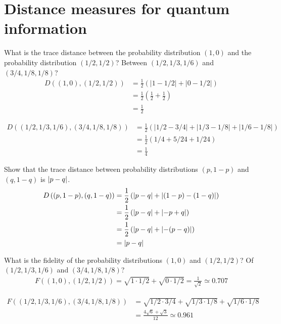 
\chapter{Distance measures for quantum information}
 What is the trace distance between the probability distribution $(1, 0)$ and the probability distribution $(1/2, 1/2)$?  Between $(1/2,1/3,1/6)$ and $(3/4, 1/8, 1/8)$?
\Soln
\begin{align*}
	D((1,0), (1/2,1/2)) &= \frac{1}{2} \left( |1 - 1/2| + |0 - 1/2| \right)\\
		&= \frac{1}{2} \left(\frac{1}{2} +  \frac{1}{2} \right)\\
		&= \frac{1}{2}
\end{align*}

\begin{align*}
	D\left( (1/2,1/3,1/6), (3/4, 1/8, 1/8)  \right) &= \frac{1}{2} \left( |1/2 - 3/4| + |1/3 - 1/8| + |1/6 - 1/8| \right)\\
		&= \frac{1}{2} \left( 1/4 + 5 / 24 + 1/24 \right)\\
		&= \frac{1}{4}
\end{align*}



 Show that the trace distance between probability distributions $(p, 1-p)$ and $(q, 1-q)$ is $\left\lvert p-q\right\rvert$.
\Soln
\begin{align*}
	D\left((p,1-p), (q, 1-q)\right) &= \frac{1}{2} \left( \left\lvert p-q\right\rvert + \left\lvert(1-p) - (1-q)\right\rvert \right)\\
		&= \frac{1}{2} \left( \left\lvert p-q\right\rvert + \left\lvert-p + q\right\rvert \right)\\
		&= \frac{1}{2} \left( \left\lvert p-q\right\rvert + \left\lvert-(p-q)\right\rvert\right) \\
		&= \left\lvert p-q\right\rvert
\end{align*}


 What is the fidelity of the probability distributions $(1, 0)$ and $(1/2, 1/2)$?  Of $(1/2,1/3,1/6)$ and $(3/4, 1/8, 1/8)$?
\Soln
\begin{align*}
	F((1,0), (1/2,1/2)) = \sqrt{1 \cdot 1/2} + \sqrt{0 \cdot 1/2} = \frac{1}{\sqrt{2}}\simeq 0.707
\end{align*}

\begin{align*}
	F\left( (1/2,1/3,1/6), (3/4, 1/8, 1/8)  \right) &= \sqrt{1/2 \cdot 3/4} + \sqrt{1/3 \cdot 1/8} + \sqrt{1/6 \cdot 1/8}\\
		&= \frac{4 \sqrt{6} + \sqrt{3}}{12} \simeq 0.961
\end{align*}



